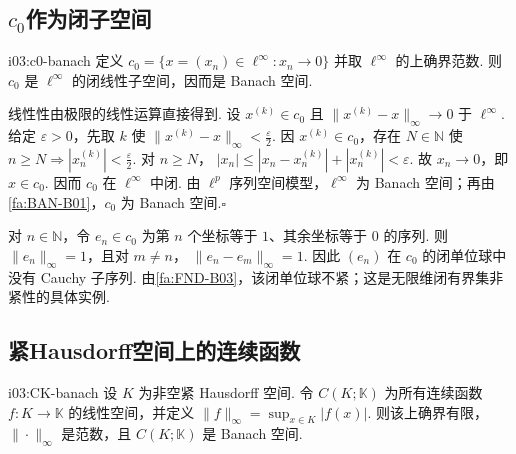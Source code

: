 \subsection{\texorpdfstring{\(\displaystyle c_0\)}{c_0}作为闭子空间}

\begin{FAProposition}{i03:c0-banach}
定义 \(\displaystyle c_0=\{x=(x_n)\in\ell^\infty:x_n\to0\}\)
并取 \(\displaystyle \ell^\infty\) 的上确界范数. 则 \(\displaystyle c_0\) 是 \(\displaystyle \ell^\infty\) 的闭线性子空间，因而是 Banach 空间.
\end{FAProposition}

\begin{FAProof}
线性性由极限的线性运算直接得到. 设 \(\displaystyle x^{(k)}\in c_0\) 且 \(\displaystyle \|x^{(k)}-x\|_\infty\to0\) 于 \(\displaystyle \ell^\infty\). 给定 \(\displaystyle \varepsilon>0\)，先取 \(\displaystyle k\) 使 \(\displaystyle \|x^{(k)}-x\|_\infty<\frac{\varepsilon}{2}\). 因 \(\displaystyle x^{(k)}\in c_0\)，存在 \(\displaystyle N\in\mathbb N\) 使 \(\displaystyle n\geqslant N\Rightarrow|x_n^{(k)}|<\frac{\varepsilon}{2}\). 对 \(\displaystyle n\geqslant N\)， \(\displaystyle |x_n| \leqslant|x_n-x_n^{(k)}|+|x_n^{(k)}| <\varepsilon\).
故 \(\displaystyle x_n\to0\)，即 \(\displaystyle x\in c_0\). 因而 \(\displaystyle c_0\) 在 \(\displaystyle \ell^\infty\) 中闭. 由 \(\displaystyle \ell^p\) 序列空间模型，\(\displaystyle \ell^\infty\) 为 Banach 空间；再由\autoref{fa:BAN-B01}，\(\displaystyle c_0\) 为 Banach 空间.\hfill\(\square\)
\end{FAProof}

\begin{FAExample}[标准单位向量]
对 \(\displaystyle n\in\mathbb N\)，令 \(\displaystyle e_n\in c_0\) 为第 \(\displaystyle n\) 个坐标等于 \(\displaystyle1\)、其余坐标等于 \(\displaystyle0\) 的序列. 则 \(\displaystyle \|e_n\|_\infty=1\)，且对 \(\displaystyle m\neq n\)，
\(\displaystyle \|e_n-e_m\|_\infty=1\).
因此 \(\displaystyle (e_n)\) 在 \(\displaystyle c_0\) 的闭单位球中没有 Cauchy 子序列. 由\autoref{fa:FND-B03}，该闭单位球不紧；这是无限维闭有界集非紧性的具体实例.
\end{FAExample}

\subsection{紧Hausdorff空间上的连续函数}

\begin{FATheorem}{i03:CK-banach}
设 \(\displaystyle K\) 为非空紧 Hausdorff 空间. 令 \(\displaystyle C(K;\mathbb K)\) 为所有连续函数 \(\displaystyle f:K\to\mathbb K\) 的线性空间，并定义 \(\displaystyle \|f\|_\infty=\sup_{x\in K}|f(x)|\).
则该上确界有限，\(\displaystyle \|\cdot\|_\infty\) 是范数，且 \(\displaystyle C(K;\mathbb K)\) 是 Banach 空间.
\end{FATheorem}


